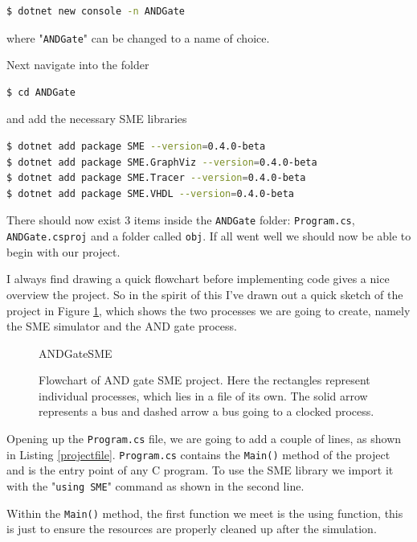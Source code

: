         \begin{lstlisting}[language=bash]
$ dotnet new console -n ANDGate
        \end{lstlisting}
        where "\texttt{ANDGate}" can be changed to a name of choice.
        
        Next navigate into the folder
        \begin{lstlisting}[language=bash]
$ cd ANDGate 
        \end{lstlisting}
        and add the necessary SME libraries
        \begin{lstlisting}[language=bash]
$ dotnet add package SME --version=0.4.0-beta
$ dotnet add package SME.GraphViz --version=0.4.0-beta
$ dotnet add package SME.Tracer --version=0.4.0-beta
$ dotnet add package SME.VHDL --version=0.4.0-beta
        \end{lstlisting}
        
        There should now exist 3 items inside the \texttt{ANDGate} folder: \texttt{Program.cs}, \texttt{ANDGate.csproj} and a folder called \texttt{obj}. If all went well we should now be able to begin with our project.
        
        I always find drawing a quick flowchart before implementing code gives a nice overview the project. So in the spirit of this I've drawn out a quick sketch of the project in Figure \ref{fig:ANDGateSME}, which shows the two processes we are going to create, namely the SME simulator and the AND gate process.
        
        \begin{figure}[h!]
            \vspace*{-1.5cm}
            \centering
            {ANDGateSME}
            \caption{Flowchart of AND gate SME project. Here the rectangles represent individual processes, which lies in a file of its own. The solid arrow represents a bus and dashed arrow a bus going to a clocked process.}
            \label{fig:ANDGateSME}
        \end{figure}  
        
        
\newpage
        Opening up the \texttt{Program.cs} file, we are going to add a couple of lines, as shown in Listing \ref{projectfile}. \texttt{Program.cs} contains the \texttt{Main()} method of the project and is the entry point of any C program. To use the SME library we import it with the "\texttt{using SME}" command as shown in the second line. 
        
        Within the \texttt{Main()} method, the first function we meet is the using function, this is just to ensure the resources are properly cleaned up after the simulation.
        
